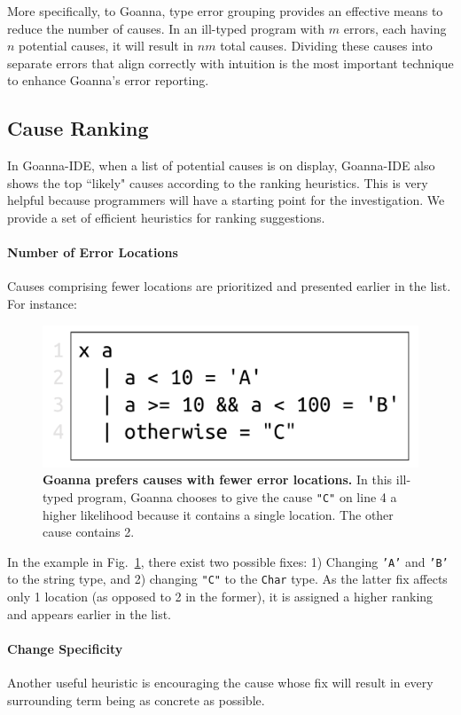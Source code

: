 \documentclass[pdflatex,lineno,sn-nature,Numbered]{sn-jnl}%
\begin{document}
	More specifically, to Goanna, type error grouping provides an effective means to reduce the number of causes. In an ill-typed program with $m$ errors, each having $n$ potential causes, it will result in $nm$ total causes. Dividing these causes into separate errors that align correctly with intuition is the most important technique to enhance Goanna's error reporting.

    \subsection{Cause Ranking} \label{sub:ranking}
     In Goanna-IDE, when a list of potential causes is on display, Goanna-IDE also shows the top ``likely" causes according to the ranking heuristics. This is very helpful because programmers will have a starting point for the investigation. We provide a set of efficient heuristics for ranking suggestions. 

    \paragraph{Number of Error Locations}
    Causes comprising fewer locations are prioritized and presented earlier in the list. For instance:
   \begin{figure}[ht!]
        \centering
        \includegraphics[width=0.5\linewidth]{images/Loc-Count}
        \caption[Goanna prefers causes with fewer error locations]{\textbf{Goanna prefers causes with fewer error locations.} In this ill-typed program, Goanna chooses to give the cause \texttt{"C"} on line 4 a higher likelihood because it contains a single location. The other cause contains 2. }
        \label{fig:loc-count}
    \end{figure}

    In the example in Fig.~\ref{fig:loc-count}, there exist two possible fixes: 1) Changing \texttt{'A'} and \texttt{'B'} to the string type, and 2) changing \texttt{"C"} to the \texttt{Char} type. As the latter fix affects only 1 location (as opposed to 2 in the former), it is assigned a higher ranking and appears earlier in the list.

    \paragraph{Change Specificity}
	Another useful heuristic is encouraging the cause whose fix will result in every surrounding term being as concrete as possible.
	
\end{document}
